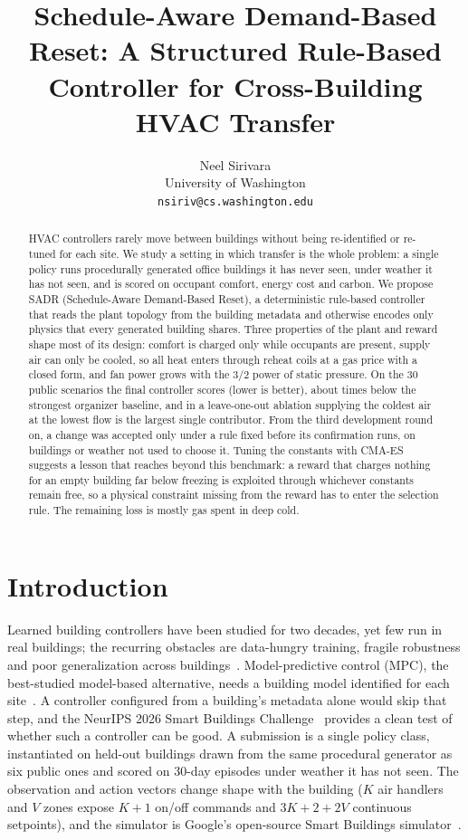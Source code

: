 \documentclass{article}
\title{Schedule-Aware Demand-Based Reset: A Structured Rule-Based Controller for Cross-Building HVAC Transfer}
\author{%
  Neel Sirivara\\
  University of Washington\\
  \texttt{nsiriv@cs.washington.edu}
}
\begin{document}
\maketitle

\begin{abstract}
HVAC controllers rarely move between buildings without being re-identified or re-tuned for each site. We study a setting in which transfer is the whole problem: a single policy runs procedurally generated office buildings it has never seen, under weather it has not seen, and is scored on occupant comfort, energy cost and carbon. We propose SADR (Schedule-Aware Demand-Based Reset), a deterministic rule-based controller that reads the plant topology from the building metadata and otherwise encodes only physics that every generated building shares. Three properties of the plant and reward shape most of its design: comfort is charged only while occupants are present, supply air can only be cooled, so all heat enters through reheat coils at a gas price with a closed form, and fan power grows with the 3/2 power of static pressure. On the 30 public scenarios the final controller scores \FinPub{} (lower is better), about \FinPwTimes{} times below the strongest organizer baseline, and in a leave-one-out ablation supplying the coldest air at the lowest flow is the largest single contributor. From the third development round on, a change was accepted only under a rule fixed before its confirmation runs, on buildings or weather not used to choose it. Tuning the constants with CMA-ES suggests a lesson that reaches beyond this benchmark: a reward that charges nothing for an empty building far below freezing is exploited through whichever constants remain free, so a physical constraint missing from the reward has to enter the selection rule. The remaining loss is mostly gas spent in deep cold.
\end{abstract}

\section{Introduction}

Learned building controllers have been studied for two decades, yet few run in real buildings; the recurring obstacles are data-hungry training, fragile robustness and poor generalization across buildings~\citep{wang2020rl}. Model-predictive control (MPC), the best-studied model-based alternative, needs a building model identified for each site~\citep{oldewurtel2012mpc,drgona2020mpc}. A controller configured from a building's metadata alone would skip that step, and the NeurIPS 2026 Smart Buildings Challenge~\citep{goldfeder2026smart,sb26kit} provides a clean test of whether such a controller can be good. A submission is a single policy class, instantiated on held-out buildings drawn from the same procedural generator as six public ones and scored on 30-day episodes under weather it has not seen. The observation and action vectors change shape with the building ($K$ air handlers and $V$ zones expose $K{+}1$ on/off commands and $3K{+}2{+}2V$ continuous setpoints), and the simulator is Google's open-source Smart Buildings simulator~\citep{goldfeder2023lightweight,goldfeder2025suite}.
\end{document}
